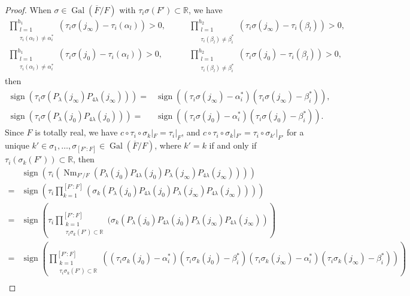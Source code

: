 \documentclass[10pt,a4paper]{amsart}
\DeclareMathOperator{\Gal}{Gal}
\DeclareMathOperator{\Nm}{Nm}
\DeclareMathOperator{\sgn}{sign}
\newcommand{\bR}{\mathbb{R}}
\begin{document}
\begin{proof}
When $\sigma\in \Gal(\overline{F}/F)$ with $\tau_i\sigma(F')\subset \bR$, we have 
\begin{align*}
   \prod_{\substack{l=1\\\tau_i(\alpha_l)\neq \alpha_i^*}}^{h_1}\left(\tau_i\sigma (j_\infty) - \tau_i(\alpha_l)\right)>0, \quad & \quad \prod_{\substack{l=1\\\tau_i(\beta_l)\neq \beta_i^*}}^{h_2}\left(\tau_i\sigma (j_\infty) - \tau_i(\beta_l)\right)>0,\\
   \prod_{\substack{l=1\\\tau_i(\alpha_l)\neq \alpha_i^*}}^{h_1}\left(\tau_i\sigma (j_0) - \tau_i(\alpha_l)\right)>0, \quad & \quad \prod_{\substack{l=1\\\tau_i(\beta_l)\neq \beta_i^*}}^{h_2}\left(\tau_i\sigma (j_0) - \tau_i(\beta_l)\right)>0,
\end{align*}
then 
\begin{align*}
    \sgn(\tau_i\sigma(P_{\lambda}(j_\infty)P_{4\lambda}(j_\infty))) = &\sgn \left((\tau_i\sigma(j_\infty) - \alpha_{i}^*)(\tau_i\sigma(j_\infty)- \beta_i^*)\right), \\
     \sgn(\tau_i\sigma(P_{\lambda}(j_0)P_{4\lambda}(j_0))) = &\sgn \left((\tau_i\sigma(j_0) - \alpha_{i}^*)(\tau_i\sigma(j_0)- \beta_i^*)\right).
\end{align*}
Since $F$ is totally real, we have $c\circ \tau_i\circ \sigma_k|_F = \tau_i|_F$, and $c\circ \tau_i\circ \sigma_k|_{F'} = \tau_i\circ \sigma_{k'}|_{F'}$ for a unique $k'\in \sigma_1, \dotsc, \sigma_{[F':F]} \in \Gal(\overline{F}/F)$, where $k' = k$ if and only if $\tau_i(\sigma_k(F'))\subset\bR$, then  
\begin{align*}
    &\sgn(\tau_i(\Nm_{F'/F}(P_{\lambda}(j_0)P_{4\lambda}(j_0)P_{\lambda}(j_\infty)P_{4\lambda}(j_\infty)))) \\=&\sgn\left(\tau_i \prod_{k=1}^{[F':F]} (\sigma_k (P_{\lambda}(j_0)P_{4\lambda}(j_0)P_{\lambda}(j_\infty)P_{4\lambda}(j_\infty)))\right) \\
    =&\sgn\left(\tau_i \prod^{[F':F]}_{\substack{k=1\\\tau_i\sigma_k(F')\subset \bR}} (\sigma_k (P_{\lambda}(j_0)P_{4\lambda}(j_0)P_{\lambda}(j_\infty)P_{4\lambda}(j_\infty))\right)\\
   = &\sgn\left(\prod^{[F':F]}_{\substack{k=1\\\tau_i\sigma_k(F')\subset \bR}}\left((\tau_i\sigma_k(j_0) - \alpha_{i}^*)(\tau_i\sigma_k(j_0)- \beta_i^*)(\tau_i\sigma_k(j_\infty) - \alpha_{i}^*)(\tau_i\sigma_k(j_\infty)- \beta_i^*)  \right)\right)\\

\end{align*}
\end{proof}
\end{document}
